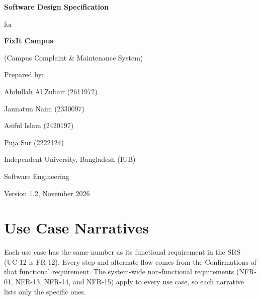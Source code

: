 \documentclass[11pt,a4paper]{report}
\begin{document}
\begin{titlepage}
\centering
\vspace*{3cm}
{\LARGE\bfseries Software Design Specification\par}
\vspace{0.5cm}
{\Large for\par}
\vspace{0.5cm}
{\LARGE\bfseries FixIt Campus\par}
\vspace{0.3cm}
{\large (Campus Complaint \& Maintenance System)\par}
\vspace{2cm}
{\large Prepared by:\par}
\vspace{0.3cm}
Abdullah Al Zubair (2611972)\par
Jannatun Naim (2330097)\par
Asiful Islam (2420197)\par
Puja Sur (2222124)\par
\vspace{1.5cm}
Independent University, Bangladesh (IUB)\par
Software Engineering\par
\vspace{1cm}
Version 1.2, November 2026
\end{titlepage}

\tableofcontents

\chapter{Use Case Narratives}
Each use case has the same number as its functional requirement in the SRS (UC-12 is FR-12). Every step and alternate flow comes from the Confirmations of that functional requirement. The system-wide non-functional requirements (NFR-01, NFR-13, NFR-14, and NFR-15) apply to every use case, so each narrative lists only the specific ones.
\end{document}
